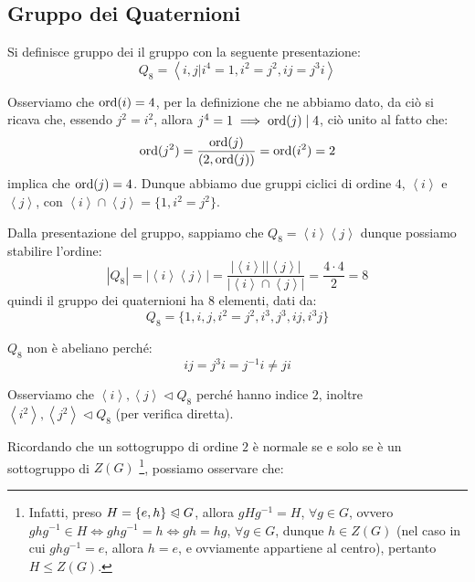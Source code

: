 \documentclass[11pt]{scrartcl}
\begin{document}
\newpage
\subsection{Gruppo dei Quaternioni}

\begin{definition}
    Si definisce gruppo dei  il gruppo con la seguente presentazione:
        \[ Q_8 = \left<i,j | i^4 = 1, i^2 = j^2, ij = j^3i\right>
            \]
\end{definition}

\begin{remark}[Ordini di $i$ e $j$]
    Osserviamo che $\operatorname{ord}(i) = 4$, per la definizione che ne abbiamo dato, da ciò si ricava che, essendo $j^2 = i^2$,
    allora $j^4 = 1 \implies \operatorname{ord}(j) \mid 4$, ciò unito al fatto che:
        \[ \operatorname{ord}(j^2) = \frac{\operatorname{ord}(j)}{(2,\operatorname{ord}(j))} = \operatorname{ord}(i^2) = 2
            \]
    implica che $\operatorname{ord}(j) = 4$. Dunque abbiamo due gruppi ciclici di ordine $4$, $\left<i\right>$ e $\left<j\right>$, con
    $\left<i\right> \cap \left<j\right> = \{1,i^2 = j^2\}$.
\end{remark}

Dalla presentazione del gruppo, sappiamo che $Q_8 = \left<i\right>\left<j\right>$ dunque possiamo stabilire l'ordine:
    \[ |Q_8| = |\left<i\right>\left<j\right>| = \frac{|\left<i\right>||\left<j\right>|}{|\left<i\right> \cap \left<j\right>|} = \frac{4 \cdot 4 }{2} = 8
        \]
quindi il gruppo dei quaternioni ha $8$ elementi, dati da:
    \[ Q_8 = \{1, i, j, i^2 = j^2, i^3, j^3, ij, i^3j\}
        \]

\begin{remark}
    $Q_8$ non è abeliano perché:
        \[ ij = j^3i = j^{-1}i \ne ji
            \]
\end{remark}

\begin{remark}
    Osserviamo che $\left<i\right>,\left<j\right> \triangleleft Q_8$ perché hanno indice $2$, inoltre $\left<i^2\right>, \left<j^2\right> \triangleleft Q_8$ (per verifica diretta). 
\end{remark}

Ricordando che un sottogruppo di ordine $2$ è normale se e solo se è un sottogruppo di $Z(G)$ \footnote{Infatti, preso $H = \{e,h\} \trianglelefteqslant G$, allora $gHg^{-1} = H$, $\forall g \in G$, ovvero $ghg^{-1} \in H \iff ghg^{-1} = h \iff
gh = hg$, $\forall g \in G$, dunque $h \in Z(G)$ (nel caso in cui $ghg^{-1} = e$, allora $h = e$, e ovviamente appartiene al centro), pertanto $H \leqslant Z(G)$.}, possiamo osservare che:
\end{document}
